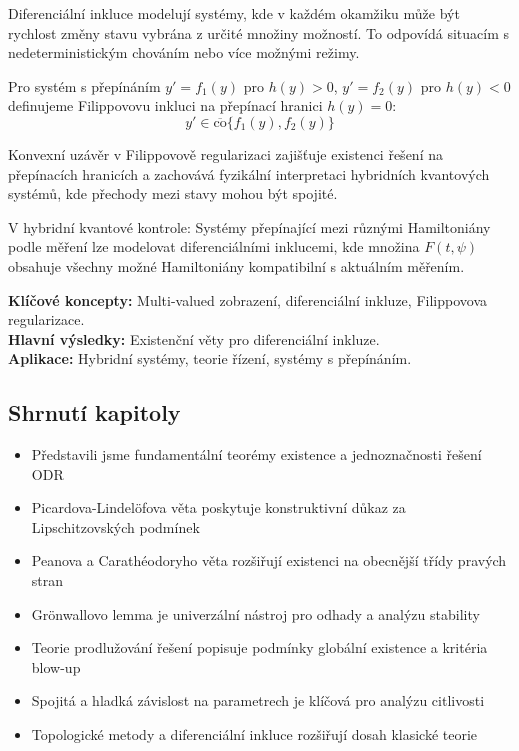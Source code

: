 \begin{intuition}
Diferenciální inkluce modelují systémy, kde v každém okamžiku může být rychlost změny stavu vybrána z určité množiny možností. To odpovídá situacím s nedeterministickým chováním nebo více možnými režimy.
\end{intuition}

\begin{example}
Pro systém s přepínáním $y' = f_1(y)$ pro $h(y) > 0$, $y' = f_2(y)$ pro $h(y) < 0$ definujeme Filippovovu inkluci na přepínací hranici $h(y) = 0$:
\[
y' \in \overline{\text{co}}\{f_1(y), f_2(y)\}
\]
\end{example}

\begin{keyinsight}
Konvexní uzávěr v Filippovově regularizaci zajišťuje existenci řešení na přepínacích hranicích a zachovává fyzikální interpretaci hybridních kvantových systémů, kde přechody mezi stavy mohou být spojité.
\end{keyinsight}

\begin{application}
V hybridní kvantové kontrole: Systémy přepínající mezi různými Hamiltoniány podle měření lze modelovat diferenciálními inklucemi, kde množina $F(t,\psi)$ obsahuje všechny možné Hamiltoniány kompatibilní s aktuálním měřením.
\end{application}

\begin{summary}
\textbf{Klíčové koncepty:} Multi-valued zobrazení, diferenciální inkluze, Filippovova regularizace. \\
\textbf{Hlavní výsledky:} Existenční věty pro diferenciální inkluze. \\
\textbf{Aplikace:} Hybridní systémy, teorie řízení, systémy s přepínáním.
\end{summary}

\spc

\subsection*{Shrnutí kapitoly}

\begin{itemize}
\item Představili jsme fundamentální teorémy existence a jednoznačnosti řešení ODR
\item Picardova-Lindelöfova věta poskytuje konstruktivní důkaz za Lipschitzovských podmínek
\item Peanova a Carathéodoryho věta rozšiřují existenci na obecnější třídy pravých stran
\item Grönwallovo lemma je univerzální nástroj pro odhady a analýzu stability
\item Teorie prodlužování řešení popisuje podmínky globální existence a kritéria blow-up
\item Spojitá a hladká závislost na parametrech je klíčová pro analýzu citlivosti
\item Topologické metody a diferenciální inkluce rozšiřují dosah klasické teorie
\end{itemize}

